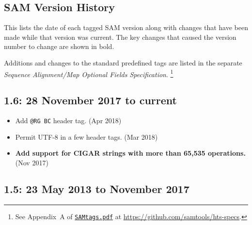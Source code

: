 \documentclass[10pt]{article}
\begin{document}
\begin{appendices}
\appendix
\section{SAM Version History}\label{sec:history}

This lists the date of each tagged SAM version along with changes that
have been made while that version was current.  The key changes
that caused the version number to change are shown in bold.

Additions and changes to the standard predefined tags are listed in the
separate {\sl Sequence Alignment/Map Optional Fields Specification}.%
\footnote{See Appendix~A of
\href{http://samtools.github.io/hts-specs/SAMtags.pdf}{\tt SAMtags.pdf}
at \url{https://github.com/samtools/hts-specs}.}

\subsection*{1.6: 28 November 2017 to current}

\begin{itemize}
\item Add {\tt @RG BC} header tag. (Apr 2018)
\item Permit UTF-8 in a few header tags. (Mar 2018)
\item\textbf{Add support for CIGAR strings with more than 65,535 operations.} (Nov 2017)
\end{itemize}

\subsection*{1.5: 23 May 2013 to November 2017}


\end{appendices}
\end{document}
